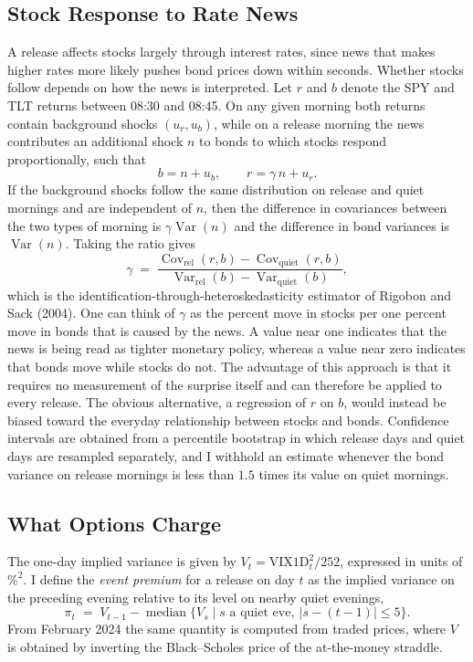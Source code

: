 \documentclass[10pt]{article}
\newcommand{\Cov}{\operatorname{Cov}}
\newcommand{\Var}{\operatorname{Var}}
\begin{document}
\subsection{Stock Response to Rate News}
A release affects stocks largely through interest rates, since news that makes higher rates more likely pushes bond prices down within seconds. Whether stocks follow depends on how the news is interpreted. Let $r$ and $b$ denote the SPY and TLT returns between 08:30 and 08:45. On any given morning both returns contain background shocks $(u_r,u_b)$, while on a release morning the news contributes an additional shock $n$ to bonds to which stocks respond proportionally, such that
\begin{equation}
b = n + u_b, \qquad r = \gamma\, n + u_r .
\end{equation}
If the background shocks follow the same distribution on release and quiet mornings and are independent of $n$, then the difference in covariances between the two types of morning is $\gamma\Var(n)$ and the difference in bond variances is $\Var(n)$. Taking the ratio gives
\begin{equation}
\gamma \;=\; \frac{\Cov_{\mathrm{rel}}(r,b)-\Cov_{\mathrm{quiet}}(r,b)}{\Var_{\mathrm{rel}}(b)-\Var_{\mathrm{quiet}}(b)} ,
\label{eq:gamma}
\end{equation}
which is the identification-through-heteroskedasticity estimator of Rigobon and Sack (2004). One can think of $\gamma$ as the percent move in stocks per one percent move in bonds that is caused by the news. A value near one indicates that the news is being read as tighter monetary policy, whereas a value near zero indicates that bonds move while stocks do not. The advantage of this approach is that it requires no measurement of the surprise itself and can therefore be applied to every release. The obvious alternative, a regression of $r$ on $b$, would instead be biased toward the everyday relationship between stocks and bonds. Confidence intervals are obtained from a percentile bootstrap in which release days and quiet days are resampled separately, and I withhold an estimate whenever the bond variance on release mornings is less than $1.5$ times its value on quiet mornings.

\subsection{What Options Charge}
The one-day implied variance is given by $V_t=\mathrm{VIX1D}_t^2/252$, expressed in units of $\%^2$. I define the \emph{event premium} for a release on day $t$ as the implied variance on the preceding evening relative to its level on nearby quiet evenings,
\begin{equation}
\pi_t \;=\; V_{t-1} - \operatorname{median}\bigl\{V_s \;\big|\; s \text{ a quiet eve},\ |s-(t-1)|\le 5\bigr\}.
\end{equation}
From February 2024 the same quantity is computed from traded prices, where $V$ is obtained by inverting the Black--Scholes price of the at-the-money straddle.
\end{document}
